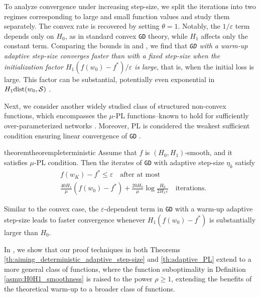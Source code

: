 \documentclass[a4paper,11pt]{article}
\newcommand{\algname}[1]{\texttt{#1}}
\newcommand{\cS}{\mathcal{S}}
\newcommand{\1}{\mathbbm{1}}
\theoremstyle{plain}
\newtheorem{theorem}{Theorem}[section]
\begin{document}
To analyze convergence under increasing step-size, we split the iterations into two regimes corresponding to large and small function values and study them separately. The convex rate is recovered by setting $\theta = 1$. Notably, the $1/\varepsilon$ term depends only on $H_0$, as in standard convex \algname{GD} theory, while $H_1$ affects only the constant term. Comparing the bounds in  and , we find that \emph{\algname{GD} with a warm-up adaptive step-size converges faster than with a fixed step-size when the initialization factor $H_1(f(w_0)-f^*)/\varepsilon$ is large}, that is, when the initial loss is large. This factor can be substantial, potentially even exponential in $H_1{\rm dist}(w_0,\cS)$ \citep{gaash2025convergence}.


Next, we consider another widely studied class of structured non-convex functions, which encompasses the $\mu$-PL functions--known to hold for sufficiently over-parameterized networks \citep{liu2022loss}. Moreover, PL is considered the weakest sufficient condition ensuring linear convergence of \algname{GD} \citep{karimi2016linear}.
\begin{restatable}{theorem}{theorempleterministic}\label{th:adaptive_PL}
Assume that $f$ is $(H_0,H_1)$-smooth, and it satisfies $\mu$-PL condition. Then the iterates of \algname{GD} with adaptive step-size $\eta_k$ 
satisfy 
    \begin{align*}
        & f(w_K) - f^* \le \varepsilon \quad \text{after at most} \\ & \frac{40H_1}{\mu}(f(w_0)-f^*) + \frac{20H_0}{\mu}\log\frac{H_0}{2H_1\varepsilon} \quad \text{iterations.}
    \end{align*}
    
    
\end{restatable}

Similar to the convex case, the $\varepsilon$-dependent term in \algname{GD} with a warm-up adaptive step-size leads to faster convergence whenever $H_1(f(w_0)-f^*)$ is substantially larger than $H_0$. 

In , we show that our proof techniques in both Theorems \ref{th:aiming_deterministic_adaptive_step-size} and \ref{th:adaptive_PL} extend to a more general class of functions, where the function suboptimality in Definition \ref{asmp:H0H1_smoothness} is raised to the power $\rho\ge 1$, extending the benefits of the theoretical warm-up to a broader class of functions.
\end{document}
